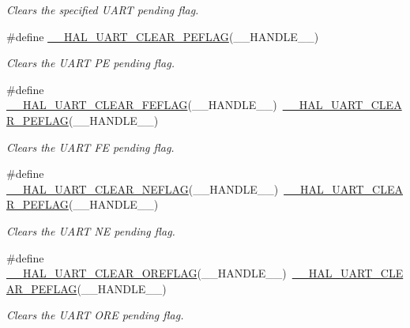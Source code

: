 \begin{DoxyCompactItemize}
\begin{DoxyCompactList}\small\item\em Clears the specified U\+A\+RT pending flag. \end{DoxyCompactList}\item 
\#define \hyperlink{group___u_a_r_t___exported___macros_gaba5e19c60e0f37341b1585a380b84d49}{\+\_\+\+\_\+\+H\+A\+L\+\_\+\+U\+A\+R\+T\+\_\+\+C\+L\+E\+A\+R\+\_\+\+P\+E\+F\+L\+AG}(\+\_\+\+\_\+\+H\+A\+N\+D\+L\+E\+\_\+\+\_\+)
\begin{DoxyCompactList}\small\item\em Clears the U\+A\+RT PE pending flag. \end{DoxyCompactList}\item 
\#define \hyperlink{group___u_a_r_t___exported___macros_gae1dfc7777b089a10464841045b524caa}{\+\_\+\+\_\+\+H\+A\+L\+\_\+\+U\+A\+R\+T\+\_\+\+C\+L\+E\+A\+R\+\_\+\+F\+E\+F\+L\+AG}(\+\_\+\+\_\+\+H\+A\+N\+D\+L\+E\+\_\+\+\_\+)~\hyperlink{group___u_a_r_t___exported___macros_gaba5e19c60e0f37341b1585a380b84d49}{\+\_\+\+\_\+\+H\+A\+L\+\_\+\+U\+A\+R\+T\+\_\+\+C\+L\+E\+A\+R\+\_\+\+P\+E\+F\+L\+AG}(\+\_\+\+\_\+\+H\+A\+N\+D\+L\+E\+\_\+\+\_\+)
\begin{DoxyCompactList}\small\item\em Clears the U\+A\+RT FE pending flag. \end{DoxyCompactList}\item 
\#define \hyperlink{group___u_a_r_t___exported___macros_gaa1f69421585b3ada4d2b81d502a3ae6b}{\+\_\+\+\_\+\+H\+A\+L\+\_\+\+U\+A\+R\+T\+\_\+\+C\+L\+E\+A\+R\+\_\+\+N\+E\+F\+L\+AG}(\+\_\+\+\_\+\+H\+A\+N\+D\+L\+E\+\_\+\+\_\+)~\hyperlink{group___u_a_r_t___exported___macros_gaba5e19c60e0f37341b1585a380b84d49}{\+\_\+\+\_\+\+H\+A\+L\+\_\+\+U\+A\+R\+T\+\_\+\+C\+L\+E\+A\+R\+\_\+\+P\+E\+F\+L\+AG}(\+\_\+\+\_\+\+H\+A\+N\+D\+L\+E\+\_\+\+\_\+)
\begin{DoxyCompactList}\small\item\em Clears the U\+A\+RT NE pending flag. \end{DoxyCompactList}\item 
\#define \hyperlink{group___u_a_r_t___exported___macros_ga9cdc2f2d55eaaa7895996bf6848df42e}{\+\_\+\+\_\+\+H\+A\+L\+\_\+\+U\+A\+R\+T\+\_\+\+C\+L\+E\+A\+R\+\_\+\+O\+R\+E\+F\+L\+AG}(\+\_\+\+\_\+\+H\+A\+N\+D\+L\+E\+\_\+\+\_\+)~\hyperlink{group___u_a_r_t___exported___macros_gaba5e19c60e0f37341b1585a380b84d49}{\+\_\+\+\_\+\+H\+A\+L\+\_\+\+U\+A\+R\+T\+\_\+\+C\+L\+E\+A\+R\+\_\+\+P\+E\+F\+L\+AG}(\+\_\+\+\_\+\+H\+A\+N\+D\+L\+E\+\_\+\+\_\+)
\begin{DoxyCompactList}\small\item\em Clears the U\+A\+RT O\+RE pending flag. \end{DoxyCompactList}\item 

\end{DoxyCompactItemize}
